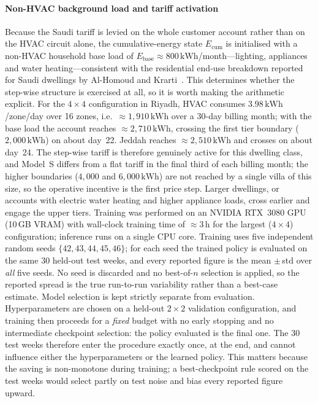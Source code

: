 \documentclass[3p,number]{elsarticle}
\newcommand{\kWh}{\text{kWh}}
\begin{document}
\paragraph{Non-HVAC background load and tariff activation}
Because the Saudi tariff is levied on the whole customer account rather than on
the HVAC circuit alone, the cumulative-energy state $E_{\mathrm{cum}}$ is
initialised with a non-HVAC household base load of
$E_{\mathrm{base}}\approx800\,\kWh$/month---lighting, appliances and water
heating---consistent with the residential end-use breakdown reported for Saudi
dwellings by Al-Homoud and Krarti~\cite{AlHomoud2021}. This determines whether
the step-wise structure is exercised at all, so it is worth making the
arithmetic explicit. For the $4\times4$ configuration in Riyadh, HVAC consumes
$3.98\,\kWh$/zone/day over 16 zones, i.e.\ ${\approx}1{,}910\,\kWh$ over a
30-day billing month; with the base load the account reaches
${\approx}2{,}710\,\kWh$, crossing the first tier boundary
($2{,}000\,\kWh$) on about day~22. Jeddah reaches ${\approx}2{,}510\,\kWh$ and
crosses on about day~24. The step-wise tariff is therefore genuinely active for
this dwelling class, and Model~S differs from a flat tariff in the final third of
each billing month; the higher boundaries ($4{,}000$ and $6{,}000\,\kWh$) are not
reached by a single villa of this size, so the operative incentive is the first
price step. Larger dwellings, or accounts with electric water heating and higher
appliance loads, cross earlier and engage the upper tiers.
Training was performed on an NVIDIA RTX~3080 GPU (10\,GB VRAM) with wall-clock training time of ${\approx}3$\,h for the largest ($4\times4$) configuration; inference runs on a single CPU core.
Training uses five independent random seeds $\{42,43,44,45,46\}$; for each seed the trained policy is evaluated on the same 30 held-out test weeks, and every reported figure is the mean $\pm$\,std over \emph{all} five seeds. No seed is discarded and no best-of-$n$ selection is applied, so the reported spread is the true run-to-run variability rather than a best-case estimate. Model selection is kept strictly separate from evaluation. Hyperparameters are chosen on a held-out $2\!\times\!2$ validation configuration, and training then proceeds for a \emph{fixed} budget with no early stopping and no intermediate checkpoint selection: the policy evaluated is the final one. The 30 test weeks therefore enter the procedure exactly once, at the end, and cannot influence either the hyperparameters or the learned policy. This matters because the saving is non-monotone during training; a best-checkpoint rule scored on the test weeks would select partly on test noise and bias every reported figure upward.
 
\end{document}
